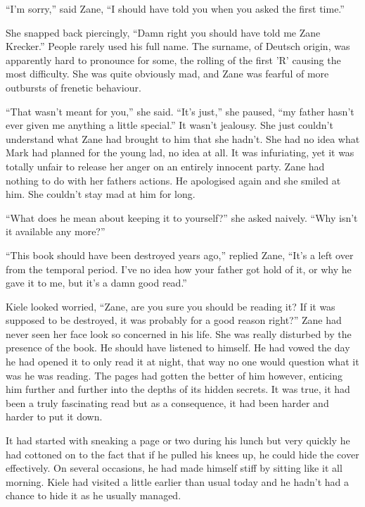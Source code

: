 ``I'm sorry,'' said Zane, ``I should have told you when you asked the first time.''

She snapped back piercingly, ``Damn right you should have told me Zane Krecker.''  People rarely used his full name.  The surname, of Deutsch origin, was apparently hard to pronounce for some, the rolling of the first 'R' causing the most difficulty.  She was quite obviously mad, and Zane was fearful of more outbursts of frenetic behaviour.  

``That wasn't meant for you,'' she said.  ``It's just,'' she paused, ``my father hasn't ever given me anything a little special.''  It wasn't jealousy.  She just couldn't understand what Zane had brought to him that she hadn't.  She had no idea what Mark had planned for the young lad, no idea at all.  It was infuriating, yet it was totally unfair to release her anger on an entirely innocent party.  Zane had nothing to do with her fathers actions.  He apologised again and she smiled at him.  She couldn't stay mad at him for long.  

``What does he mean about keeping it to yourself?'' she asked naively.  ``Why isn't it available any more?''

``This book should have been destroyed years ago,'' replied Zane, ``It's a left over from the temporal period.  I've no idea how your father got hold of it, or why he gave it to me, but it's a damn good read.''

Kiele looked worried, ``Zane, are you sure you should be reading it?  If it was supposed to be destroyed, it was probably for a good reason right?''  Zane had never seen her face look so concerned in his life.  She was really disturbed by the presence of the book.  He should have listened to himself.  He had vowed the day he had opened it to only read it at night, that way no one would question what it was he was reading.  The pages had gotten the better of him however, enticing him further and further into the depths of its hidden secrets.  It was true, it had been a truly fascinating read but as a consequence, it had been harder and harder to put it down.

It had started with sneaking a page or two during his lunch but very quickly he had cottoned on to the fact that if he pulled his knees up, he could hide the cover effectively.  On several occasions, he had made himself stiff by sitting like it all morning.  Kiele had visited a little earlier than usual today and he hadn't had a chance to hide it as he usually managed.  

